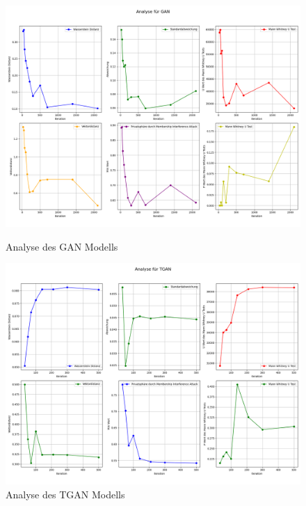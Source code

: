 \begin{figure}[ht]
    \centering
    \begin{minipage}{0.5\textwidth}
        \centering
        \includegraphics[width=\textwidth]{includes/figures/graphs/GAN_analysis.png}
        \caption{Analyse des GAN Modells}
        \label{fig:graphs_gan_analysis}
    \end{minipage}\hfill
    \begin{minipage}{0.5\textwidth}
        \centering
        \includegraphics[width=\textwidth]{includes/figures/graphs/TGAN_analysis.png}
        \caption{Analyse des TGAN Modells}
        \label{fig:graphs_tgan_analysis}
    \end{minipage}
\end{figure}


